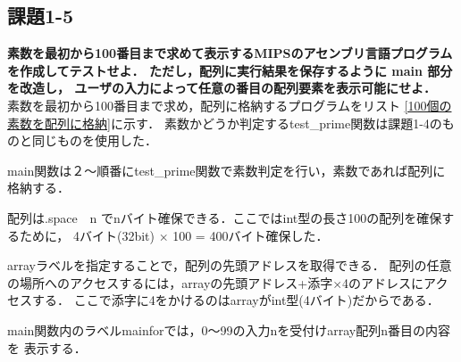 \documentclass[11pt]{jarticle}
\begin{document}
\subsection{課題1-5}

\textbf{素数を最初から100番目まで求めて表示するMIPSのアセンブリ言語プログラムを作成してテストせよ． ただし，配列に実行結果を保存するように main 部分を改造し， ユーザの入力によって任意の番目の配列要素を表示可能にせよ．}\\

素数を最初から100番目まで求め，配列に格納するプログラムをリスト
\ref{100個の素数を配列に格納}に示す．
素数かどうか判定するtest\_prime関数は課題1-4のものと同じものを使用した．

main関数は２～順番にtest\_prime関数で素数判定を行い，素数であれば配列に格納する．

配列は.space　n でnバイト確保できる．ここではint型の長さ100の配列を確保するために，
4バイト(32bit) $\times$ 100 = 400バイト確保した．

arrayラベルを指定することで，配列の先頭アドレスを取得できる．
配列の任意の場所へのアクセスするには，arrayの先頭アドレス+添字$\times$4のアドレスにアクセスする．
ここで添字に4をかけるのはarrayがint型(4バイト)だからである．

main関数内のラベルmainforでは，0～99の入力nを受付けarray配列n番目の内容を
表示する．
\end{document}
